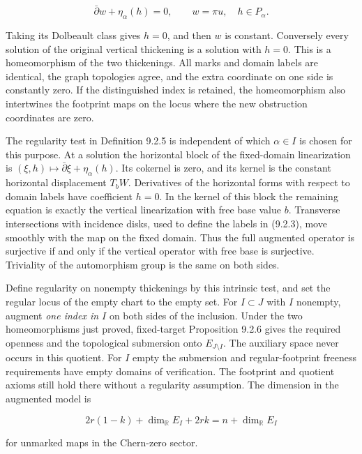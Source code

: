 \[
        \bar\partial w+\eta_\alpha(h)=0,\qquad
        w=\pi u,\quad h\in P_\alpha .
\]

Taking its Dolbeault class gives $h=0$, and then $w$ is constant.
Conversely every solution of the original vertical thickening
is a solution with $h=0$. This is a homeomorphism of the two
thickenings. All marks and domain labels are identical, the graph
topologies agree, and the extra coordinate on one side is constantly
zero. If the distinguished index is retained, the homeomorphism
also intertwines the footprint maps on the locus where the new
obstruction coordinates are zero.

The regularity test in Definition 9.2.5 is independent of which
$\alpha\in I$ is chosen for this purpose. At a solution the
horizontal block of the fixed-domain linearization is
$(\xi,h)\mapsto\bar\partial\xi+\eta_\alpha(h)$. Its cokernel is
zero, and its kernel is the constant horizontal displacement
$T_bW$. Derivatives of the horizontal forms with respect to domain
labels have coefficient $h=0$. In the kernel of this block the
remaining equation is exactly the vertical linearization with
free base value $b$. Transverse intersections with incidence disks,
used to define the labels in (9.2.3), move smoothly with the map
on the fixed domain. Thus the full augmented operator is surjective
if and only if the vertical operator with free base is surjective.
Triviality of the automorphism group is the same on both sides.

Define regularity on nonempty thickenings by this intrinsic test,
and set the regular locus of the empty chart to the empty set.
For $I\subset J$ with $I$ nonempty, augment \emph{one index in $I$}
on both sides of the inclusion. Under the two homeomorphisms just
proved, fixed-target Proposition 9.2.6 gives the required openness
and the topological submersion onto $E_{J\setminus I}$. The
auxiliary space never occurs in this quotient. For $I$ empty the
submersion and regular-footprint freeness requirements have empty
domains of verification. The footprint and quotient axioms still
hold there without a regularity assumption. The dimension in the
augmented model is

\[
       2r(1-k)+\dim_{\mathbb R} E_I+2rk=n+\dim_{\mathbb R}E_I
\]

for unmarked maps in the Chern-zero sector.


